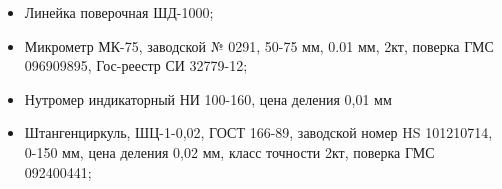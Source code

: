 \begin{itemize}
	\item   Линейка поверочная ШД-1000;
	\item 	
	Микрометр МК-75, заводской № 0291, 50-75 мм, 0.01 мм, 2кт, поверка ГМС 096909895, Гос-реестр СИ 32779-12;
	\item 	
	Нутромер индикаторный НИ 100-160, цена деления 0,01 мм
	\item 	
	Штангенциркуль, ШЦ-1-0,02, ГОСТ 166-89, заводской номер HS 101210714, 0-150 мм, цена деления 0,02 мм, класс точности 2кт, поверка ГМС 092400441;

\end{itemize}
